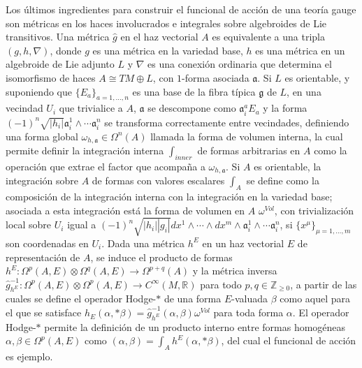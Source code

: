\documentclass{article}
\begin{document}
Los últimos ingredientes para construir el funcional de acción de una teoría gauge son métricas en los haces involucrados e integrales sobre algebroides de Lie transitivos. Una métrica $\hat g$ en el haz vectorial $A$ es equivalente a una tripla $(g, h, \nabla)$, donde $g$ es una métrica en la variedad base, $h$ es una métrica en un algebroide de Lie adjunto $L$ y $\nabla$ es una conexión ordinaria que determina el isomorfismo de haces $A \cong TM \oplus L$, con $1$-forma asociada $\mathfrak a$. Si $L$ es orientable, y suponiendo que $\{E_a\}_{a = 1, \dots, n}$ es una base de la fibra típica $\mathfrak g$ de $L$, en una vecindad $U_i$ que trivialice a $A$, $\mathfrak a$ se descompone como $\mathfrak a_i^a E_a$ y la forma $(-1)^{n}\sqrt{|h_i|} \mathfrak a_i^1 \wedge \cdots \mathfrak a_i^{n}$ se transforma correctamente entre vecindades, definiendo una forma global $\omega_{h,\mathfrak a} \in \Omega^{n}(A)$ llamada la forma de volumen interna, la cual permite definir la integración interna $\int_{inner}$ de formas arbitrarias en $A$ como la operación que extrae el factor que acompaña a $\omega_{h,\mathfrak a}$. Si $A$ es orientable, la integración sobre $A$ de formas con valores escalares $\int_A$ se define como la composición de la integración interna con la integración en la variedad base; asociada a esta integración está la forma de volumen en $A$ $\omega^{Vol}$, con trivialización local sobre $U_i$ igual a $(-1)^{n}\sqrt{|h_i| |g_i|} dx^1\wedge\cdots \wedge dx^m \wedge \mathfrak a_i^1 \wedge \cdots \mathfrak a_i^{n}$, si $\{x^\mu\}_{\mu = 1, \dots, m}$ son coordenadas en $U_i$. Dada una métrica $h^E$ en un haz vectorial $E$ de representación de $A$, se induce el producto de formas $h^E: \Omega^p(A, E)\otimes \Omega^q(A, E) \to \Omega^{p+q}(A)$ y la métrica inversa $\hat g^{-1}_{h^E}: \Omega^p(A, E)\otimes \Omega^p(A, E) \to C^\infty(M, \mathbb R)$ para todo $p, q \in \mathbb Z_{\geq 0}$, a partir de las cuales se define el operador Hodge-$*$ de una forma $E$-valuada $\beta$ como aquel para el que se satisface $h_E(\alpha, *\beta) = \hat g_{h^E}^{-1}(\alpha, \beta) \omega^{Vol}$ para toda forma $\alpha$. El operador Hodge-$*$ permite la definición de un producto interno entre formas homogéneas $\alpha, \beta \in \Omega^p(A, E)$ como $(\alpha, \beta) = \int_A h^E(\alpha, *\beta)$, del cual el funcional de acción es ejemplo.
\end{document}
